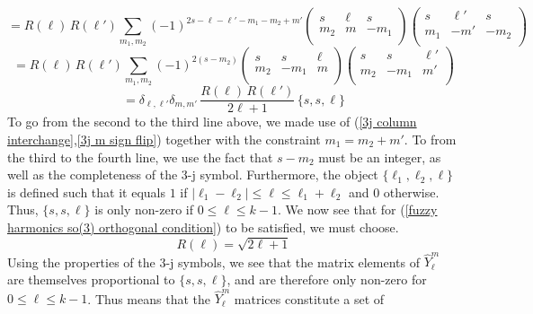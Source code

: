 %
%
\begin{equation*}
=
R(\ell) \, R(\ell') \sum_{m_1,m_2} (-1)^{2 s - \ell - \ell' - m_1 - m_2 + m'}
\left( \begin{array}{ccc}
s & \ell & s \\
m_2 & m & -m_1 \\
\end{array} \right)
\left( \begin{array}{ccc}
s & \ell' & s \\
m_1 & -m' & -m_2 \\
\end{array} \right)
\end{equation*}
%
%
\begin{equation*}
=
R(\ell) \, R(\ell') \sum_{m_1,m_2} (-1)^{2 (s - m_2)}
\left( \begin{array}{ccc}
s & s & \ell \\
m_2 & -m_1 & m \\
\end{array} \right)
\left( \begin{array}{ccc}
s & s & \ell' \\
m_2 & -m_1 & m' \\
\end{array} \right)
\end{equation*}
%
%
\begin{equation}
=
\delta_{\ell, \ell'} \delta_{m,m'} \, 
\frac{R(\ell) \, R(\ell')}{2 \ell + 1} \, \{ s, s, \ell \}
\end{equation}
%
%
To go from the second to the third line above, we made use of (\ref{3j column interchange},\ref{3j m sign flip}) together with the constraint $m_1 = m_2 + m'$. To from the third to the fourth line, we use the fact that $s - m_2$ must be an integer, as well as the completeness of the 3-j symbol. Furthermore, the object $\{ \ell_1, \ell_2, \ell \}$ is defined such that it equals $1$ if $|\ell_1 - \ell_2| \leq \ell \leq \ell_1 + \ell_2$ and $0$ otherwise. Thus, $\{ s, s, \ell \}$ is only non-zero if $0 \leq \ell \leq k-1$. We now see that for (\ref{fuzzy harmonics so(3) orthogonal condition}) to be satisfied, we must choose.
%
%
\begin{equation}
R(\ell) = \sqrt{2 \ell + 1}
\end{equation}
%
%
Using the properties of the 3-j symbols, we see that the matrix elements of $\hat{Y}^m_\ell$ are themselves proportional to $\{ s, s, \ell \}$, and are therefore only non-zero for $0 \leq \ell \leq k-1$. Thus means that the $\hat{Y}^m_\ell$ matrices constitute a set of
